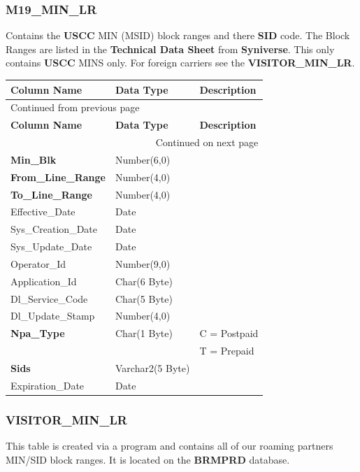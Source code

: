 \documentclass[12pt,twoside]{article}
\begin{document}
\subsubsection{M19\_MIN\_LR}
\label{sec:orgheadline105}
Contains the \textbf{USCC} MIN (MSID) block ranges and there \textbf{SID}
code. The Block Ranges are listed in the \textbf{Technical Data Sheet}
from \textbf{Syniverse}. This only contains \textbf{USCC} MINS only. For
foreign carriers see the \textbf{VISITOR\_MIN\_LR}.
\footnotesize

\begin{longtable}{l|l|l}
\hline
\textbf{Column Name} & \textbf{Data Type} & \textbf{Description}\\
\hline
\endfirsthead
\multicolumn{3}{l}{Continued from previous page} \\
\hline

\textbf{Column Name} & \textbf{Data Type} & \textbf{Description} \\

\hline
\endhead
\hline\multicolumn{3}{r}{Continued on next page} \\
\endfoot
\endlastfoot
\hline
\textbf{Min\_Blk} & Number(6,0) & \\
\textbf{From\_Line\_Range} & Number(4,0) & \\
\textbf{To\_Line\_Range} & Number(4,0) & \\
Effective\_Date & Date & \\
Sys\_Creation\_Date & Date & \\
Sys\_Update\_Date & Date & \\
Operator\_Id & Number(9,0) & \\
Application\_Id & Char(6 Byte) & \\
Dl\_Service\_Code & Char(5 Byte) & \\
Dl\_Update\_Stamp & Number(4,0) & \\
\textbf{Npa\_Type} & Char(1 Byte) & C = Postpaid\\
 &  & T = Prepaid\\
\textbf{Sids} & Varchar2(5 Byte) & \\
Expiration\_Date & Date & \\
\hline
\end{longtable}

\normalsize

\subsubsection{VISITOR\_MIN\_LR}
\label{sec:orgheadline106}
This table is created via a program and contains all of our
roaming partners MIN/SID block ranges. It is located on the
\textbf{BRMPRD} database.
\end{document}
